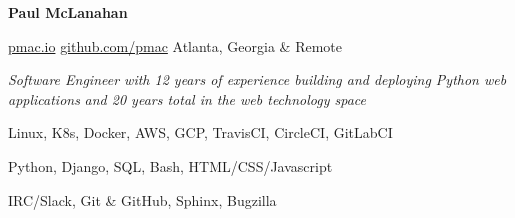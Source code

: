 \documentclass[11pt]{article} %
\begin{document}
\centerline{{\Huge \bf Paul McLanahan}}

\bigskip

        {\href{https://pmac.io}{pmac.io}}
        {\href{https://github.com/pmac}{github.com/pmac}}
        {Atlanta, Georgia \& Remote}


\center
\emph{Software Engineer with 12 years of experience building and deploying Python web applications}
\linebreak
\emph{and 20 years total in the web technology space}
\endcenter

      {Linux, K8s, Docker, AWS, GCP, TravisCI, CircleCI, GitLabCI}

      {Python, Django, SQL, Bash, HTML/CSS/Javascript}

      {IRC/Slack, Git \& GitHub, Sphinx, Bugzilla}

\end{document}

